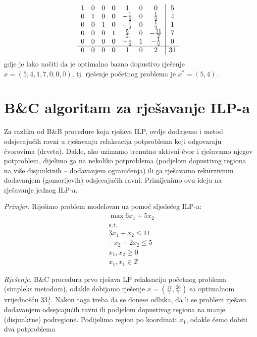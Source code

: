 \documentclass[a4paper, utf8, 11pt, colorlinks]{book}
\begin{document}
$$ \begin{array}{ccccccc| c}
    1    &   0   &   0   &  0 &  1  &   0    &    0    & 5  \\
0    &   1   &   0   &  0   &   -\frac{1}{2}    &   0   & \frac{1}{2} & 4 \\
0    &   0   &   1   &  0   &   -\frac{7}{2}    &   0   & \frac{1}{2} & 1 \\
0    &   0   &   0   &  1  &   \frac{5}{2}    &  0 &  -\frac{11}{2}    & 7 \\ 
0    &   0   &   0   &   0 &  -\frac{1}{2}    &   1   & - \frac{1}{2} & 0\\ \hline
0    &   0   &   0   &  0  &   1    &    0   & 2 & 31  
\end{array} 
$$
gdje je lako uočiti da je optimalno bazno dopustivo rješenje $x=(5, 4, 1, 7, 0, 0, 0 )$, tj. rješenje početnog problema je $x^*=(5, 4)$.

\section{B\&C algoritam za rješavanje ILP-a}
Za razliku od B\&B procedure koja rješava ILP, ovdje dodajemo i metod odsjecajućih ravni u rješavanju relaksacija potproblema koji odgovaraju čvorovima (drveta). Dakle, ako  uzimamo trenutno aktivni čvor i rješavamo njegov potproblem, dijelimo ga na nekoliko potproblema (podjelom dopustivog regiona na više disjunktnih -- dodavanjem ograničenja) ili ga rješavamo rekurzivnim dodavanjem (gomorijevih) odsjecajućih ravni. Primijenimo ovu ideju na rješavanje jednog ILP-a.

\emph{Primjer}.  Riješimo problem modelovan uz pomoć sljedećeg ILP-a:
\begin{align*}
    &\max 6 x_1 + 5 x_2 \\
    & \mbox{s.t. } \\
    & 3x_1 + x_2 \leq 11 \\
    & - x_2 + 2 x_2 \leq 5 \\
    & x_1, x_2 \geq 0 \\
    & x_1, x_1 \in \mathbb{Z}
\end{align*}

\emph{Rješenje}. B\&C procedura prvo rješava LP relaksaciju početnog problema (simpleks metodom), odakle dobijamo rješenje $x=(\frac{17}{7}, \frac{26}{7})$
sa optimalnom vrijednošću $33\frac{1}{7}$. Nakon toga treba da se donese odluka, da li se problem rješava dodavanjem odsejcajućih ravni ili podjelom dopustivog regiona na manje (disjunktne) podregione. Podijelimo region po koordinati $x_1$, odakle ćemo dobiti dva potproblema 
\end{document}
